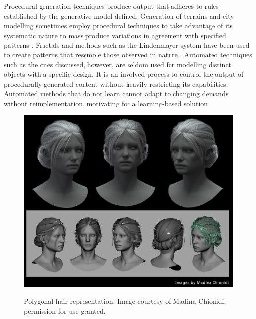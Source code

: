\documentclass[ %
author={Dillon Keith Diep},
supervisor={Dr. Carl Henrik Ek},
degree={MEng},
title={ART-CG Hair:},
subtitle={Assisted Real-time Content Generation of Stylised Virtual Hair},
type={Research},
year={2017} ]{dissertation}
\begin{document}
Procedural generation techniques produce output that adheres to rules established by the generative model defined. Generation of terrains and city modelling sometimes employ procedural techniques to take advantage of its systematic nature to mass produce variations in agreement with specified patterns \cite{procedural1}. Fractals and methods such as the Lindenmayer system have been used to create patterns that resemble those observed in nature \cite{lsystem}. Automated techniques such as the ones discussed, however, are seldom used for modelling distinct objects with a specific design. It is an involved process to control the output of procedurally generated content without heavily restricting its capabilities. Automated methods that do not learn cannot adapt to changing demands without reimplementation, motivating for a learning-based solution.

\begin{figure}[!h]
	\centering
	\caption{Polygonal hair representation. Image courtesy of Madina Chionidi, permission for use granted.}
	\includegraphics[scale=0.3]{images/hairExemplar}\\
	\label{hairExemplar}
\end{figure}
\end{document}
